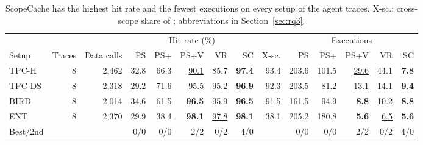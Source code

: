 \begin{table}[t]
\centering
\caption{ScopeCache has the highest hit rate and the fewest executions on every setup of the agent traces. X-sc.: cross-scope share of ; abbreviations in Section~\ref{sec:rq3}.}
\label{tab:agent}
\footnotesize
\setlength{\tabcolsep}{4pt}
\begin{tabular}{@{}lrrrrrrrrrrrrr@{}}
\toprule
 & & & \multicolumn{5}{c}{Hit rate (\%)} & & \multicolumn{5}{c}{Executions}\\
\cmidrule(lr){4-8}\cmidrule(l){10-14}
Setup & Traces & Data calls & PS & PS+ & PS+V & VR & SC & X-sc. & PS & PS+ & PS+V & VR & SC\\
\midrule
TPC-H & 8 & 2{,}462 & 32.8 & 66.3 & \underline{90.1} & 85.7 & \textbf{97.4} & 93.4 & 203.6 & 101.5 & \underline{29.6} & 44.1 & \textbf{7.8}\\
TPC-DS & 8 & 2{,}318 & 29.2 & 71.6 & \underline{95.5} & 95.2 & \textbf{96.9} & 92.3 & 203.5 & 81.2 & \underline{13.1} & 14.1 & \textbf{9.4}\\
BIRD & 8 & 2{,}014 & 34.6 & 61.5 & \textbf{96.5} & \underline{95.9} & \textbf{96.5} & 91.5 & 161.5 & 94.9 & \textbf{8.8} & \underline{10.2} & \textbf{8.8}\\
ENT & 8 & 2{,}370 & 29.9 & 38.4 & \textbf{98.1} & \underline{97.8} & \textbf{98.1} & 38.1 & 205.2 & 180.8 & \textbf{5.6} & \underline{6.5} & \textbf{5.6}\\
\midrule
Best/2nd & & & 0/0 & 0/0 & 2/2 & 0/2 & 4/0 & & 0/0 & 0/0 & 2/2 & 0/2 & 4/0\\
\bottomrule
\end{tabular}
\end{table}
